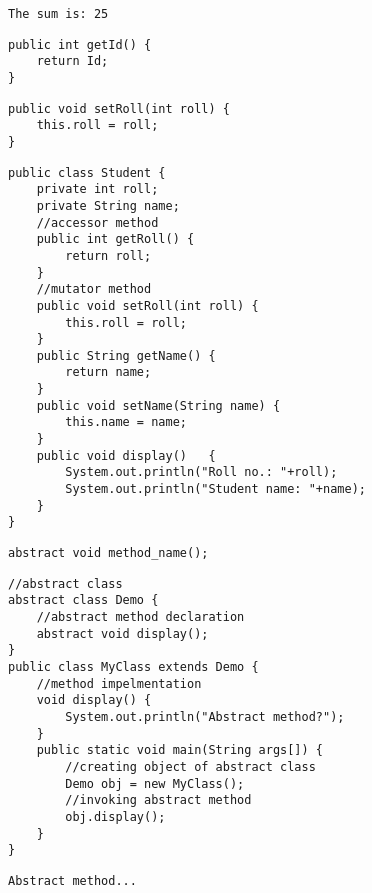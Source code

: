 \documentclass{book}
\def\lthtmlcheckvsize{\ifdim\ht\sizebox<\vsize 
  \ifdim\wd\sizebox<\hsize\expandafter\hfill\fi \expandafter\vfill
  \else\expandafter\vss\fi}%
\begin{document}
{\newpage\clearpage
{}%
\begin{lstlisting}
The sum is: 25
\end{lstlisting}%
\lthtmlfigureZ
\lthtmlcheckvsize\clearpage}

{\newpage\clearpage
{}%
\begin{lstlisting}
public int getId() {    
	return Id;    
}    
\end{lstlisting}%
\lthtmlfigureZ
\lthtmlcheckvsize\clearpage}

{\newpage\clearpage
{}%
\begin{lstlisting}
public void setRoll(int roll) {  
	this.roll = roll;  
}  
\end{lstlisting}%
\lthtmlfigureZ
\lthtmlcheckvsize\clearpage}

{\newpage\clearpage
{}%
\begin{lstlisting}
public class Student {  
	private int roll;  
	private String name;  
	//accessor method  
	public int getRoll() {  
		return roll;  
	}  
	//mutator method  
	public void setRoll(int roll) {  
		this.roll = roll;  
	}  
	public String getName()	{  
		return name;  
	}  
	public void setName(String name) {  
		this.name = name;  
	}  
	public void display()	{  
		System.out.println("Roll no.: "+roll);  
		System.out.println("Student name: "+name);  
	}  
}  
\end{lstlisting}%
\lthtmlfigureZ
\lthtmlcheckvsize\clearpage}

{\newpage\clearpage
{}%
\begin{lstlisting}
abstract void method_name();  
\end{lstlisting}%
\lthtmlfigureZ
\lthtmlcheckvsize\clearpage}

{\newpage\clearpage
{}%
\begin{lstlisting}
//abstract class  
abstract class Demo {  
	//abstract method declaration  
	abstract void display();  
}  
public class MyClass extends Demo {  
	//method impelmentation  
	void display() {  
		System.out.println("Abstract method?");  
	}  
	public static void main(String args[]) {  
		//creating object of abstract class  
		Demo obj = new MyClass();  
		//invoking abstract method  
		obj.display();  
	}  
}  
\end{lstlisting}%
\lthtmlfigureZ
\lthtmlcheckvsize\clearpage}

{\newpage\clearpage
{}%
\begin{lstlisting}
Abstract method...
\end{lstlisting}%
\lthtmlfigureZ
\lthtmlcheckvsize\clearpage}
\end{document}
